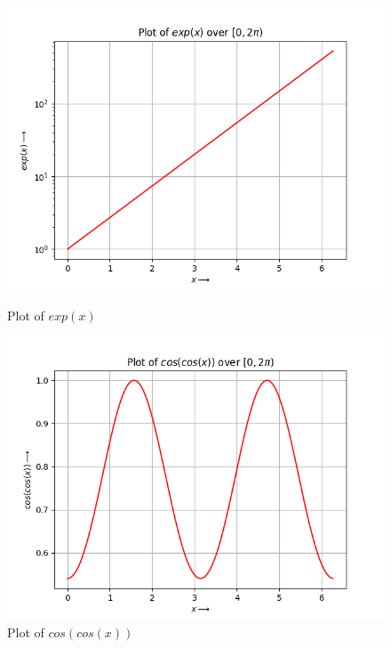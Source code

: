 \documentclass[12pt, a4paper]{article}
\begin{document}
	\begin{figure}[H]
		\centering
		\includegraphics[scale=0.75]{Figure_13.png}
		\caption{Plot of $exp(x)$}
		\centering
		\includegraphics[scale=0.75]{Figure_14.png}
		\caption{Plot of $cos(cos(x))$}
	\end{figure}
	
\end{document}
